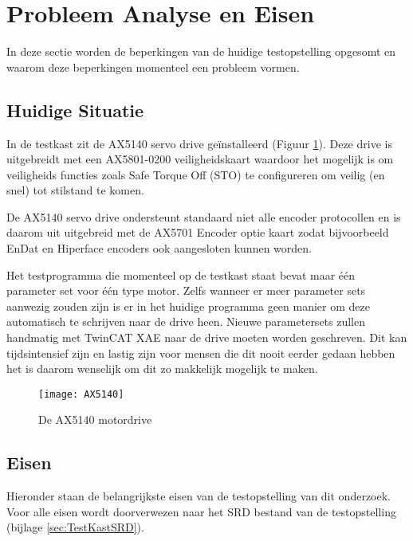 \section{Probleem Analyse en Eisen}

In deze sectie worden de beperkingen van de huidige testopstelling opgesomt en waarom deze beperkingen momenteel een probleem vormen.

\subsection{Huidige Situatie}

In de testkast zit de AX5140 servo drive geïnstalleerd (Figuur \ref{fig:AX5140}). Deze drive is uitgebreidt met een AX5801-0200 veiligheidskaart waardoor het mogelijk is om veiligheids functies zoals Safe Torque Off (\gls{STO}) te configureren om veilig (en snel) tot stilstand te komen.

\vspace{0.5cm}

De AX5140 servo drive ondersteunt standaard niet alle encoder protocollen en is daarom uit uitgebreid met de AX5701 Encoder optie kaart zodat bijvoorbeeld EnDat en Hiperface encoders ook aangesloten kunnen worden.

\vspace{0.5cm}

Het testprogramma die momenteel op de testkast staat bevat maar één parameter set voor één type motor. Zelfs wanneer er meer parameter sets aanwezig zouden zijn is er in het huidige programma geen manier om deze automatisch te schrijven naar de drive heen. Nieuwe parametersets zullen handmatig met TwinCAT XAE naar de drive moeten worden geschreven. Dit kan tijdsintensief zijn en lastig zijn voor mensen die dit nooit eerder gedaan hebben het is daarom wenselijk om dit zo makkelijk mogelijk te maken.

\begin{figure}[h]
	\centering
	\texttt{[image: AX5140]}
	\label{fig:AX5140}
	\caption{De \gls{AX5140} motordrive \cite{web:AX5140Drive}}
\end{figure}

\newpage

\subsection{Eisen}

Hieronder staan de belangrijkste eisen van de testopstelling van dit onderzoek. Voor alle eisen wordt doorverwezen naar het SRD bestand van de testopstelling (bijlage \ref{sec:TestKastSRD}).

